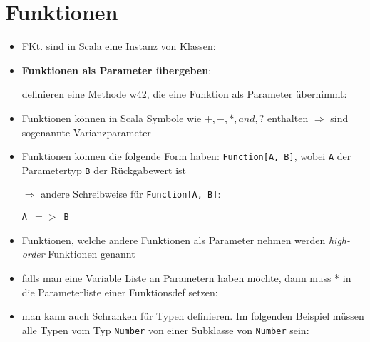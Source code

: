 \section{Funktionen}
\begin{itemize}
  \item FKt. sind in Scala eine Instanz von Klassen:
  
  
  
  \item \textbf{Funktionen als Parameter übergeben}:
  
  definieren eine Methode w42, die eine Funktion als Parameter übernimmt:
  
  

  \item Funktionen können in Scala Symbole wie $+, -, *, and, ?$ enthalten
  $\Rightarrow$ sind sogenannte Varianzparameter
  \item Funktionen können die folgende Form
  haben: \texttt{Function[A, B]}, wobei \texttt{A} der Parametertyp 
  \und \texttt{B} der Rückgabewert ist
  
  $\Rightarrow$ andere Schreibweise für \texttt{Function[A, B]}:
  
  \begin{center}
    \texttt{A $=>$ B}
  \end{center}
    
  \item Funktionen, welche andere Funktionen als Parameter nehmen werden
  \textit{high-order} Funktionen genannt
    \item falls man eine Variable Liste an Parametern haben möchte, dann muss *
  in die Parameterliste einer Funktionsdef setzen:
  

    
  \item man kann auch Schranken für Typen definieren. Im folgenden Beispiel müssen alle Typen vom Typ \texttt{Number} \oder von einer Subklasse von
  \texttt{Number} sein:
  
  

\end{itemize}



